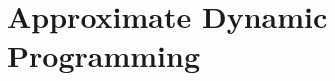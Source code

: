 \documentclass[12pt]{book}
\begin{document}
% 

% 

% 



% 

% 

% 

% 


% 

\chapter{Approximate Dynamic Programming}
\label{chapter:approx-dp}





\end{document}
